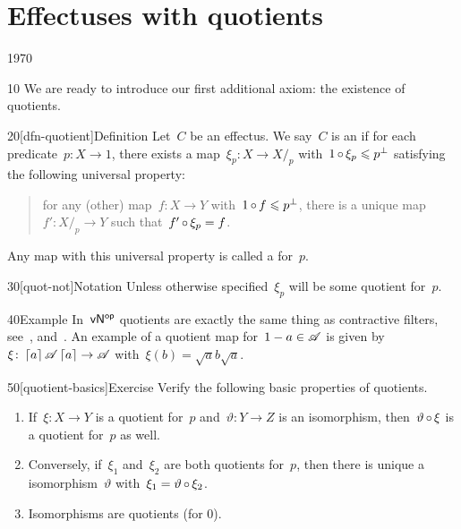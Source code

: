\section{Effectuses with quotients}
\begin{parsec}{1970}%
\begin{point}{10}%
We are ready to introduce our first additional axiom:
    the existence of quotients.
\end{point}
\begin{point}{20}[dfn-quotient]{Definition}%
Let~$C$ be an effectus.
We say~$C$ is an 
    if for each predicate~$p \colon X \to 1$,
    there exists a map~$\xi_p \colon X \to X/_p$
    with~$1 \mathop{\circ} \xi_p \leqslant p^\perp$
    satisfying the following universal property:
\begin{quote}
    for any (other) map~$f\colon X \to Y$
        with~$1 \mathop{\circ} f \leqslant p^\perp$,
        there is a unique map~$f' \colon X/_p \to Y$
        such that~$f' \mathop{\circ} \xi_p = f$.
\end{quote}
Any  map with this universal property
    is called a  for~$p$.
\begin{point}{30}[quot-not]{Notation}%
Unless otherwise specified~$\xi_p$ will be some
    quotient for~$p$.
\end{point}
\end{point}
\begin{point}{40}{Example}%
In~${\mathsf{vN}}{^{\mathsf{op}}}$ quotients are exactly the same thing
    as contractive filters,
    see~, 
    and~.
An example of a quotient map for~$1-a \in \mathscr{A}$ is given
    by~$\xi\colon \left\lceil a\right\rceil\mathscr{A} \left\lceil a\right\rceil \to \mathscr{A}$
    with~$\xi(b) = \sqrt{a} b \sqrt{a}$.
\end{point}
\begin{point}{50}[quotient-basics]{Exercise}%
Verify the following basic properties of quotients.
\begin{enumerate}
    \item If~$\xi\colon X \to Y$ is a quotient for~$p$
                and~$\vartheta\colon Y \to Z$ is an isomorphism,
                then~$\vartheta \mathop{\circ} \xi$ is a quotient for~$p$
                as well.
    \item Conversely, if~$\xi_1$ and~$\xi_2$
            are both quotients for~$p$,
            then there is unique a isomorphism~$\vartheta$
            with~$\xi_1 = \vartheta \mathop{\circ} \xi_2$.
    \item Isomorphisms are quotients (for 0).

\end{enumerate}
\end{point}
\end{parsec}

